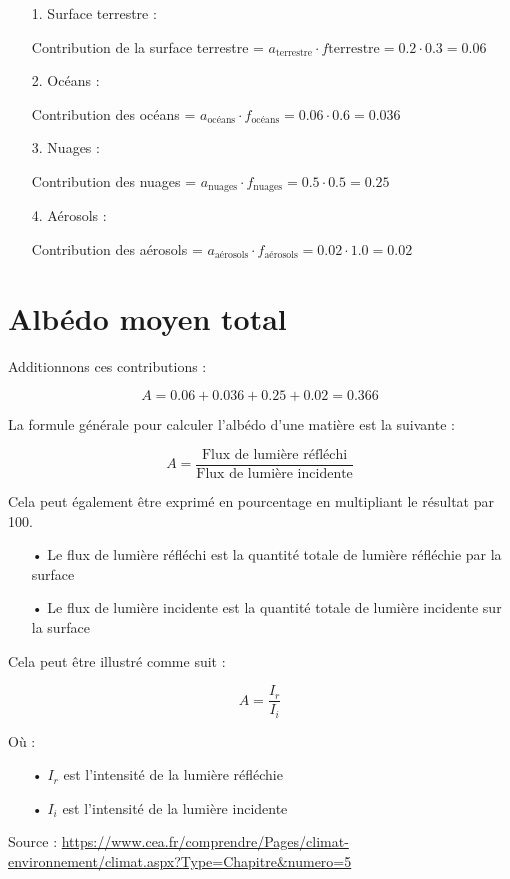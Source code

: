 \documentclass[a4paper,11pt]{article}
\begin{document}
\begin{enumerate}

\item[1.] Surface terrestre :

Contribution de la surface terrestre = $a_{\text{terrestre}} \cdot f{\text{terrestre}} = 0.2 \cdot 0.3 = 0.06$

\item[2.] Océans :

Contribution des océans = $a_{\text{océans}} \cdot f_{\text{océans}} = 0.06 \cdot 0.6 = 0.036$

\item[3.] Nuages :

Contribution des nuages = $a_{\text{nuages}} \cdot f_{\text{nuages}} = 0.5 \cdot 0.5 = 0.25$

\item[4.] Aérosols :

Contribution des aérosols = $a_{\text{aérosols}} \cdot f_{\text{aérosols}} = 0.02 \cdot 1.0 = 0.02$

\end{enumerate}


\section{Albédo moyen total}

Additionnons ces contributions :

\[ A = 0.06 +0.036 +0.25 + 0.02 = 0.366 \] 


La formule générale pour calculer l'albédo d'une matière est la suivante :

\[ A = \dfrac{\text{Flux de lumière réfléchi}}{\text{Flux de lumière incidente}} \]

Cela peut également être exprimé en pourcentage en multipliant le résultat par 100.

\begin{enumerate}

\item[•] Le flux de lumière réfléchi est la quantité totale de lumière réfléchie par la surface
\item[•] Le flux de lumière incidente est la quantité totale de lumière incidente sur la surface

\end{enumerate}

Cela peut être illustré comme suit :

\[ A = \dfrac{I_r}{I_i} \]

Où :

\begin{enumerate}

\item[•] $I_r$ est l'intensité de la lumière réfléchie
\item[•] $I_i$ est l'intensité de la lumière incidente \\

\end{enumerate}

Source : \url{https://www.cea.fr/comprendre/Pages/climat-environnement/climat.aspx?Type=Chapitre&numero=5}
\end{document}
